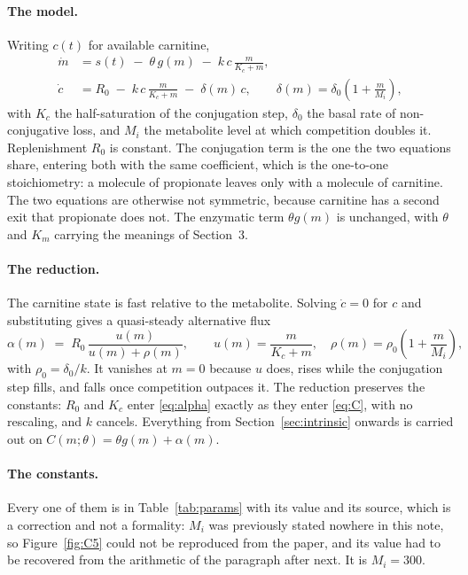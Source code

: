 \paragraph{The model.} Writing $c(t)$ for available carnitine,
\begin{equation}
\begin{aligned}
\dot m &= s(t) \;-\; \theta\, g(m) \;-\; k\, c\, \frac{m}{K_c + m}, \\[2pt]
\dot c &= R_0 \;-\; k\, c\, \frac{m}{K_c + m} \;-\; \delta(m)\, c ,
\qquad \delta(m) = \delta_0\left(1 + \frac{m}{M_i}\right),
\end{aligned}
\label{eq:C}
\end{equation}
with $K_c$ the half-saturation of the conjugation step, $\delta_0$ the basal rate of
non-conjugative loss, and $M_i$ the metabolite level at which competition doubles it.
Replenishment $R_0$ is constant. The conjugation term is the one the two equations share,
entering both with the same coefficient, which is the one-to-one stoichiometry: a molecule
of propionate leaves only with a molecule of carnitine. The two equations are otherwise not
symmetric, because carnitine has a second exit that propionate does not. The enzymatic term
$\theta g(m)$ is unchanged, with $\theta$ and $K_m$ carrying the meanings of Section~3.

\paragraph{The reduction.} The carnitine state is fast relative to the metabolite. Solving
$\dot c = 0$ for $c$ and substituting gives a quasi-steady alternative flux
\begin{equation}
\alpha(m) \;=\; R_0\,\frac{u(m)}{u(m) + \rho(m)},
\qquad u(m) = \frac{m}{K_c+m}, \quad \rho(m) = \rho_0\left(1 + \frac{m}{M_i}\right),
\label{eq:alpha}
\end{equation}
with $\rho_0 = \delta_0/k$. It vanishes at $m = 0$ because $u$ does, rises while the
conjugation step fills, and falls once competition outpaces it. The reduction preserves the
constants: $R_0$ and $K_c$ enter \eqref{eq:alpha} exactly as they enter \eqref{eq:C}, with
no rescaling, and $k$ cancels. Everything from Section~\ref{sec:intrinsic} onwards is
carried out on $C(m;\theta) = \theta g(m) + \alpha(m)$.

\paragraph{The constants.} Every one of them is in Table~\ref{tab:params} with its value and
its source, which is a correction and not a formality: $M_i$ was previously stated nowhere
in this note, so Figure~\ref{fig:C5} could not be reproduced from the paper, and its value
had to be recovered from the arithmetic of the paragraph after next. It is $M_i = 300$.

